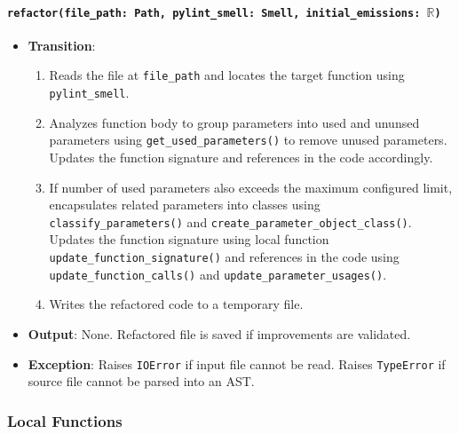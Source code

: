 \documentclass[12pt, titlepage]{article}
\begin{document}
\paragraph{\texttt{refactor(file\_path: Path, pylint\_smell: Smell, initial\_emissions: $\mathbb{R}$)}}
\begin{itemize}
  \item \textbf{Transition}:
  \begin{enumerate}
  \item Reads the file at \texttt{file\_path} and locates the target function using \texttt{pylint\_smell}.
  \item Analyzes function body to group parameters into used and ununsed parameters using \texttt{get\_used\_parameters()} to remove unused parameters. Updates the function signature and references in the code accordingly.
  \item If number of used parameters also exceeds the maximum configured limit, encapsulates related parameters into classes using \texttt{classify\_parameters()} and \texttt{create\_parameter\_object\_class()}. Updates the function signature using local function \texttt{update\_function\_signature()} and references in the code  using \texttt{update\_function\_calls()} and \texttt{update\_parameter\_usages()}.
  \item Writes the refactored code to a temporary file.
  \end{enumerate}
  \item \textbf{Output}: None. Refactored file is saved if improvements are validated. 
  \item \textbf{Exception}: Raises \texttt{IOError} if input file cannot be read. Raises \texttt{TypeError} if source file cannot be parsed into an AST.
  \end{itemize}

\subsubsection{Local Functions}
\end{document}
